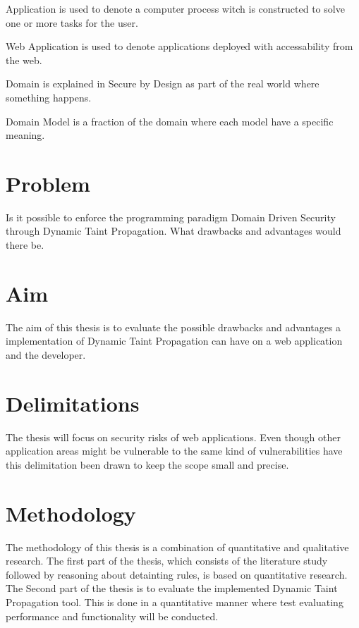 \begin{definition}{Application} 
	is used to denote a computer process witch is constructed to solve one or more tasks for the user.
\end{definition}

\begin{definition}{Web Application} 
	is used to denote applications deployed with accessability from the web.
\end{definition}

\begin{definition}{Domain}
	is explained in Secure by Design \parencite{sbd2018} as part of the real world where something happens.
\end{definition}

\begin{definition}{Domain Model}
	is a fraction of the domain where each model have a specific meaning.
\end{definition}


\section{Problem}
Is it possible to enforce the programming paradigm Domain Driven Security through Dynamic Taint Propagation. What drawbacks and advantages would there be.  


\section{Aim}
The aim of this thesis is to evaluate the possible drawbacks and advantages a implementation of Dynamic Taint Propagation can have on a web application and the developer.


\section{Delimitations}
The thesis will focus on security risks of web applications. Even though other application areas might be vulnerable to the same kind of vulnerabilities have this delimitation been drawn to keep the scope small and precise.


\section{Methodology}
The methodology of this thesis is a combination of quantitative and qualitative research. The first part of the thesis, which consists of the literature study followed by reasoning about detainting rules, is based on quantitative research. The Second part of the thesis is to evaluate the implemented Dynamic Taint Propagation tool. This is done in a quantitative manner where test evaluating performance and functionality will be conducted.
